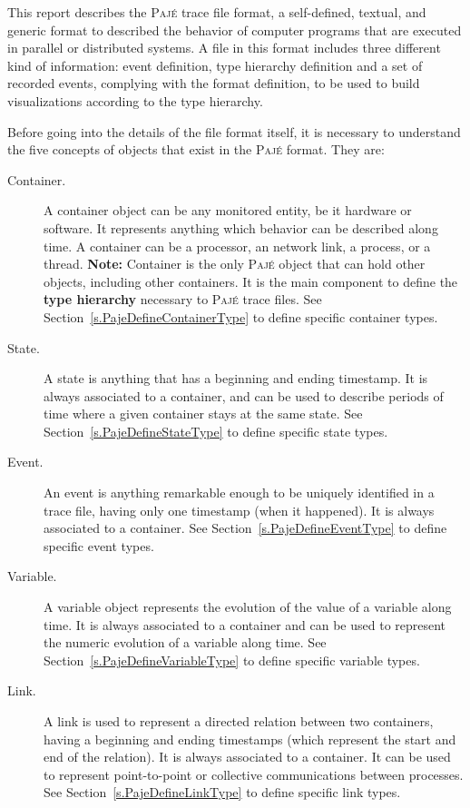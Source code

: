 \documentclass[12pt]{article}
\newcommand{\Paje}{\textsc{Paj\'e}\xspace}
\begin{document}
This report describes the \Paje trace file format, a self-defined,
textual, and generic format to described the behavior of computer
programs that are executed in parallel or distributed systems. A file
in this format includes three different kind of information: event
definition, type hierarchy definition and a set of recorded events,
complying with the format definition, to be used to build
visualizations according to the type hierarchy.

Before going into the details of the file format itself, it is
necessary to understand the five concepts of objects that exist in the
\Paje format. They are:

\begin{description}
\item [Container.] A container object can be any monitored entity, be
  it hardware or software. It represents anything which behavior can
  be described along time. A container can be a processor, an network
  link, a process, or a thread. {\bf Note:} Container is the only
  \Paje object that can hold other objects, including other
  containers. It is the main component to define the {\bf type
    hierarchy} necessary to \Paje trace files.  See
  Section~\ref{s.PajeDefineContainerType} to define specific container
  types.

\item [State.] A state is anything that has a beginning and ending
  timestamp. It is always associated to a container, and can be used
  to describe periods of time where a given container stays at the
  same state.  See Section~\ref{s.PajeDefineStateType} to define
  specific state types.

\item [Event.] An event is anything remarkable enough to be uniquely
  identified in a trace file, having only one timestamp (when it
  happened). It is always associated to a container.  See
  Section~\ref{s.PajeDefineEventType} to define specific event types.

\item [Variable.] A variable object represents the evolution of the
  value of a variable along time. It is always associated to a
  container and can be used to represent the numeric evolution of a
  variable along time. See Section~\ref{s.PajeDefineVariableType} to
  define specific variable types.

\item [Link.] A link is used to represent a directed relation between
  two containers, having a beginning and ending timestamps (which
  represent the start and end of the relation). It is always
  associated to a container. It can be used to represent
  point-to-point or collective communications between processes.  See
  Section~\ref{s.PajeDefineLinkType} to define specific link types.
\end{description}
\end{document}
